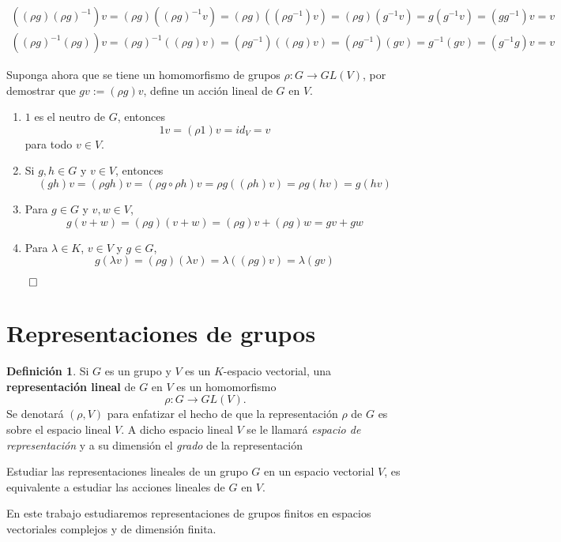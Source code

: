 \documentclass[12pt]{book}
\theoremstyle{definition}
\newtheorem{definition}[theorem]{Definición}
\newcounter{in}
\newcounter{ini}
\begin{document}
{  \begin{eqnarray*}
     ((\rho g)(\rho g)^{-1})v=(\rho g)((\rho g)^{-1}v)=(\rho g)((\rho g^{-1})v)=(\rho g)(g^{-1}v)=g(g^{-1}v)=(gg^{-1})v=v\\
     ((\rho g)^{-1}(\rho g))v=(\rho g)^{-1}((\rho g)v)=(\rho g^{-1})((\rho g)v)=(\rho g^{-1})(gv)=g^{-1}(gv)=(g^{-1}g)v=v
   \end{eqnarray*}

Suponga ahora que se tiene un homomorfismo de grupos $\rho:G\rightarrow GL(V)$, por demostrar que $gv:=(\rho g)v$, define un
acción lineal de $G$ en $V$. 

\begin{enumerate} 
   \item $1$ es el neutro de $G$, entonces $$1v=(\rho 1)v=id_{V}=v$$ para
     todo $v\in V$. 
   \item Si $g,h\in G$ y $v\in V$, entonces $$(gh)v=(\rho g h)v=(\rho
     g \circ \rho h)v=\rho g((\rho h)v)=\rho g(hv)=g(hv)$$
   \item Para $g\in G$ y $v,w\in V$, $$g(v+w)=(\rho g)(v+w)=(\rho g)v+(\rho g)w=gv+gw$$
   \item Para $\lambda\in K$, $v\in V$ y $g\in G$, 
    $$g(\lambda v)=(\rho g)(\lambda v)=\lambda((\rho g)v)=\lambda(gv)$$
\end{enumerate}

$\qed$

\section{Representaciones de grupos}

\begin{definition}
  Si $G$ es un grupo y $V$ es un $K$-espacio vectorial, una
  \textbf{representación lineal} de $G$ en $V$ es un homomorfismo 
     $$\rho:G\rightarrow GL(V).$$
  Se denotará $(\rho,V)$ para enfatizar el hecho de que la
  representación $\rho$ de $G$  es sobre el espacio lineal $V$. A
  dicho espacio lineal $V$ se le llamará \emph{espacio de representación} y a
  su dimensión el \emph{grado} de la representación 
\end{definition}

Estudiar las representaciones lineales de un grupo $G$ en un espacio
vectorial $V$, es equivalente a estudiar las acciones lineales de $G$
en $V$. 

En este trabajo estudiaremos representaciones de grupos finitos en
espacios vectoriales complejos y de dimensión finita. 

}
\end{document}
